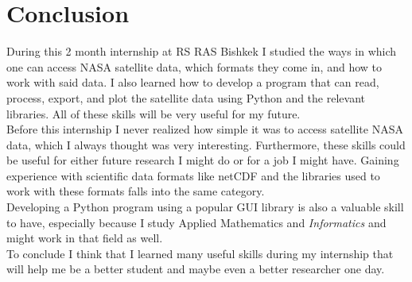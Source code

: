 \documentclass[../00_main.tex]{subfiles}
\begin{document}
\section{Conclusion}

During this 2 month internship at RS RAS Bishkek I studied the ways in which
one can access NASA satellite data, which formats they come in, and how to work
with said data. I also learned how to develop a program that can read, process,
export, and plot the satellite data using Python and the relevant libraries.
All of these skills will be very useful for my future.\\
Before this internship I never realized how simple it was to access satellite
NASA data, which I always thought was very interesting. Furthermore, these
skills could be useful for either future research I might do or for a job
I might have. Gaining experience with scientific data formats like netCDF and
the libraries used to work with these formats falls into the same category.\\
Developing a Python program using a popular GUI library is also a valuable
skill to have, especially because I study Applied Mathematics and
\textit{Informatics} and might work in that field as well.\\
To conclude I think that I learned many useful skills during my internship that
will help me be a better student and maybe even a better researcher one day.
\end{document}
